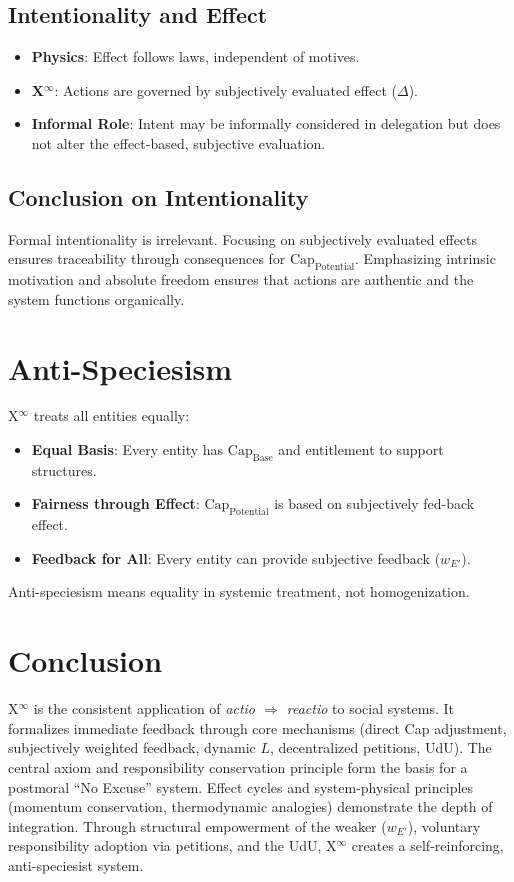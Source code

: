 \documentclass[12pt]{scrartcl}
\begin{document}
\subsection{Intentionality and Effect}
\begin{itemize}
    \item \textbf{Physics}: Effect follows laws, independent of motives.
    \item \textbf{X$^\infty$}: Actions are governed by subjectively evaluated effect ($\Delta$).
    \item \textbf{Informal Role}: Intent may be informally considered in delegation but does not alter the effect-based, subjective evaluation.
\end{itemize}

\subsection{Conclusion on Intentionality}
Formal intentionality is irrelevant. Focusing on subjectively evaluated effects ensures traceability through consequences for $\text{Cap}_{\text{Potential}}$. Emphasizing intrinsic motivation and absolute freedom ensures that actions are authentic and the system functions organically.

\section{Anti-Speciesism}
X$^\infty$ treats all entities equally:
\begin{itemize}
    \item \textbf{Equal Basis}: Every entity has $\text{Cap}_{\text{Base}}$ and entitlement to support structures.
    \item \textbf{Fairness through Effect}: $\text{Cap}_{\text{Potential}}$ is based on subjectively fed-back effect.
    \item \textbf{Feedback for All}: Every entity can provide subjective feedback ($w_{E'}$).
\end{itemize}
Anti-speciesism means equality in systemic treatment, not homogenization.

\section{Conclusion}
X$^\infty$ is the consistent application of \emph{actio $\Rightarrow$ reactio} to social systems. It formalizes immediate feedback through core mechanisms (direct Cap adjustment, subjectively weighted feedback, dynamic $L$, decentralized petitions, UdU). The central axiom and responsibility conservation principle form the basis for a postmoral “No Excuse” system. Effect cycles and system-physical principles (momentum conservation, thermodynamic analogies) demonstrate the depth of integration. Through structural empowerment of the weaker ($w_{E'}$), voluntary responsibility adoption via petitions, and the UdU, X$^\infty$ creates a self-reinforcing, anti-speciesist system.
\end{document}
